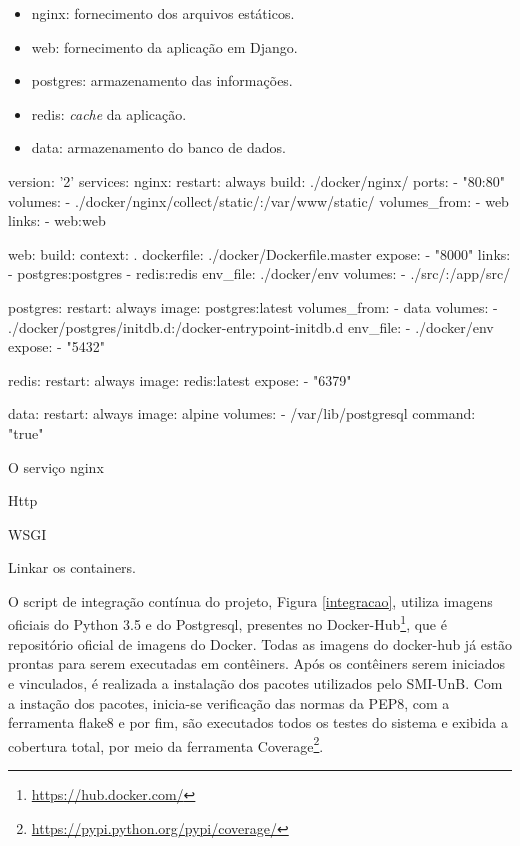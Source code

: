 \begin{itemize}
    \item nginx: fornecimento dos arquivos estáticos.
    \item web: fornecimento da aplicação em Django.
    \item postgres: armazenamento das informações.
    \item redis: \textit{cache} da aplicação.
    \item data: armazenamento do banco de dados.
\end{itemize}

\begin{python}[caption={Serviços Utilizados pelo SMI-UnB.}, captionpos=b, label={services}]
version: '2'
services:
  nginx:
    restart: always
    build: ./docker/nginx/
    ports:
      - "80:80"
    volumes:
      - ./docker/nginx/collect/static/:/var/www/static/
    volumes_from:
      - web
    links:
      - web:web

  web:
    build:
      context: .
      dockerfile: ./docker/Dockerfile.master
    expose:
      - "8000"
    links:
      - postgres:postgres
      - redis:redis
    env_file: ./docker/env
    volumes:
      - ./src/:/app/src/

  postgres:
    restart: always
    image: postgres:latest
    volumes_from:
      - data
    volumes:
      - ./docker/postgres/initdb.d:/docker-entrypoint-initdb.d
    env_file:
      - ./docker/env
    expose:
      - "5432"

  redis:
    restart: always
    image: redis:latest
    expose:
      - "6379"

  data:
    restart: always
    image: alpine
    volumes:
      - /var/lib/postgresql
    command: "true"
\end{python}

O serviço nginx

Http

WSGI

Linkar os containers.

O script de integração contínua do projeto, Figura \ref{integracao}, utiliza imagens oficiais do Python 3.5 e do Postgresql, presentes no Docker-Hub\footnote{\url{https://hub.docker.com/}}, que é repositório oficial de imagens do Docker. Todas as imagens do docker-hub já estão prontas para serem executadas em contêiners. Após os contêiners serem iniciados e vinculados, é realizada a instalação dos pacotes utilizados pelo SMI-UnB. Com a instação dos pacotes, inicia-se verificação das normas da PEP8, com a ferramenta flake8 e por fim, são executados todos os testes do sistema e exibida a cobertura total, por meio da ferramenta Coverage\footnote{\url{https://pypi.python.org/pypi/coverage/}}.

